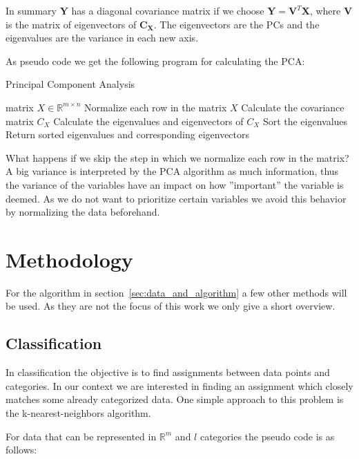\documentclass[a4paper]{IEEEtran}
\begin{document}
In summary $\mathbf{Y}$ has a diagonal covariance matrix if we choose $\mathbf{Y} = \mathbf{V}^T\mathbf{X}$, where $\mathbf{V}$ is the matrix of eigenvectors of $\mathbf{C}_\mathbf{X}$. The eigenvectors are the PCs and the eigenvalues are the variance in each new axis.

As pseudo code we get the following program for calculating the PCA:

\begin{algorithm}
	\caption{Principal Component Analysis}\label{alg:pca}
	\begin{algorithmic}
		\Require matrix $X \in \mathbb{R}^{m\times n}$
		\State Normalize each row in the matrix $X$
		\State Calculate the covariance matrix $C_{X}$
		\State Calculate the eigenvalues and eigenvectors of $C_{X}$
		\State Sort the eigenvalues
		\State Return sorted eigenvalues and corresponding eigenvectors
	\end{algorithmic}
\end{algorithm}

What happens if we skip the step in which we normalize each row in the matrix? A big variance is interpreted by the PCA algorithm as much information, thus the variance of the variables have an impact on how ''important'' the variable is deemed. As we do not want to prioritize certain variables we avoid this behavior by normalizing the data beforehand.

\section{Methodology}
\label{sec:methodology}

For the algorithm in section~\ref{sec:data_and_algorithm} a few other methods will be used. As they are not the focus of this work we only give a short overview.

\subsection{Classification}
\label{subsec:classification}

In classification the objective is to find assignments between data points and categories. In our context we are interested in finding an assignment which closely matches some already categorized data. One simple approach to this problem is the k-nearest-neighbors algorithm.

For data that can be represented in $\mathbb{R}^m$ and $l$ categories the pseudo code is as follows:
\end{document}
